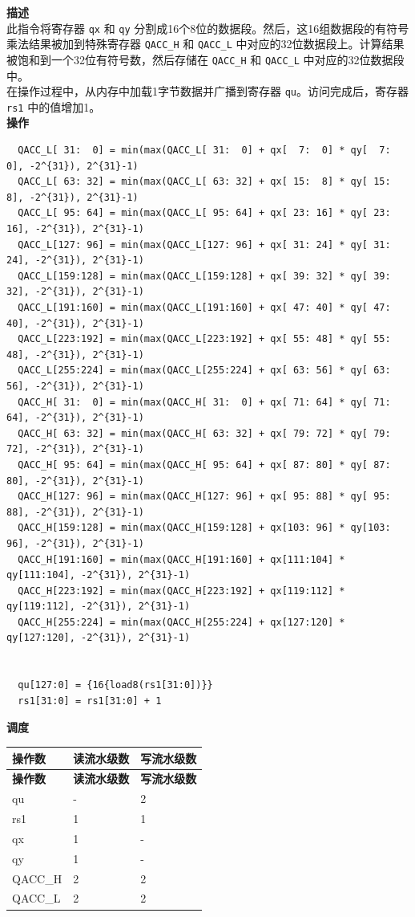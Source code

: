 \textbf{描述}\\
此指令将寄存器 \lstinline{qx} 和 \lstinline{qy} 分割成16个8位的数据段。然后，这16组数据段的有符号乘法结果被加到特殊寄存器 \lstinline{QACC_H} 和 \lstinline{QACC_L} 中对应的32位数据段上。计算结果被饱和到一个32位有符号数，然后存储在 \lstinline{QACC_H} 和 \lstinline{QACC_L} 中对应的32位数据段中。\\
在操作过程中，从内存中加载1字节数据并广播到寄存器 \lstinline{qu}。访问完成后，寄存器 \lstinline{rs1} 中的值增加1。\\
\textbf{操作}
\begin{lstlisting}
  QACC_L[ 31:  0] = min(max(QACC_L[ 31:  0] + qx[  7:  0] * qy[  7:  0], -2^{31}), 2^{31}-1)
  QACC_L[ 63: 32] = min(max(QACC_L[ 63: 32] + qx[ 15:  8] * qy[ 15:  8], -2^{31}), 2^{31}-1)
  QACC_L[ 95: 64] = min(max(QACC_L[ 95: 64] + qx[ 23: 16] * qy[ 23: 16], -2^{31}), 2^{31}-1)
  QACC_L[127: 96] = min(max(QACC_L[127: 96] + qx[ 31: 24] * qy[ 31: 24], -2^{31}), 2^{31}-1)
  QACC_L[159:128] = min(max(QACC_L[159:128] + qx[ 39: 32] * qy[ 39: 32], -2^{31}), 2^{31}-1)
  QACC_L[191:160] = min(max(QACC_L[191:160] + qx[ 47: 40] * qy[ 47: 40], -2^{31}), 2^{31}-1)
  QACC_L[223:192] = min(max(QACC_L[223:192] + qx[ 55: 48] * qy[ 55: 48], -2^{31}), 2^{31}-1)
  QACC_L[255:224] = min(max(QACC_L[255:224] + qx[ 63: 56] * qy[ 63: 56], -2^{31}), 2^{31}-1)
  QACC_H[ 31:  0] = min(max(QACC_H[ 31:  0] + qx[ 71: 64] * qy[ 71: 64], -2^{31}), 2^{31}-1)
  QACC_H[ 63: 32] = min(max(QACC_H[ 63: 32] + qx[ 79: 72] * qy[ 79: 72], -2^{31}), 2^{31}-1)
  QACC_H[ 95: 64] = min(max(QACC_H[ 95: 64] + qx[ 87: 80] * qy[ 87: 80], -2^{31}), 2^{31}-1)
  QACC_H[127: 96] = min(max(QACC_H[127: 96] + qx[ 95: 88] * qy[ 95: 88], -2^{31}), 2^{31}-1)
  QACC_H[159:128] = min(max(QACC_H[159:128] + qx[103: 96] * qy[103: 96], -2^{31}), 2^{31}-1)
  QACC_H[191:160] = min(max(QACC_H[191:160] + qx[111:104] * qy[111:104], -2^{31}), 2^{31}-1)
  QACC_H[223:192] = min(max(QACC_H[223:192] + qx[119:112] * qy[119:112], -2^{31}), 2^{31}-1)
  QACC_H[255:224] = min(max(QACC_H[255:224] + qx[127:120] * qy[127:120], -2^{31}), 2^{31}-1)


  qu[127:0] = {16{load8(rs1[31:0])}}
  rs1[31:0] = rs1[31:0] + 1
\end{lstlisting}

\textbf{调度}\\
\begin{longtable}[c]{|l|l|l|}
    \hline
    \rowcolor{lightgray}
    \textbf{操作数} & \textbf{读流水级数} & \textbf{写流水级数} \\\hline
    \endfirsthead
    \hline
    \rowcolor{lightgray}
     \textbf{操作数} & \textbf{读流水级数} & \textbf{写流水级数} \\\hline
    \endhead
    \hline
    \endfoot

    qu & - & 2 \\\hline
    rs1 & 1 & 1 \\\hline
     qx & 1 & - \\\hline
     qy & 1 & - \\\hline
     QACC\_H & 2 & 2 \\\hline
     QACC\_L & 2 & 2

\end{longtable}

